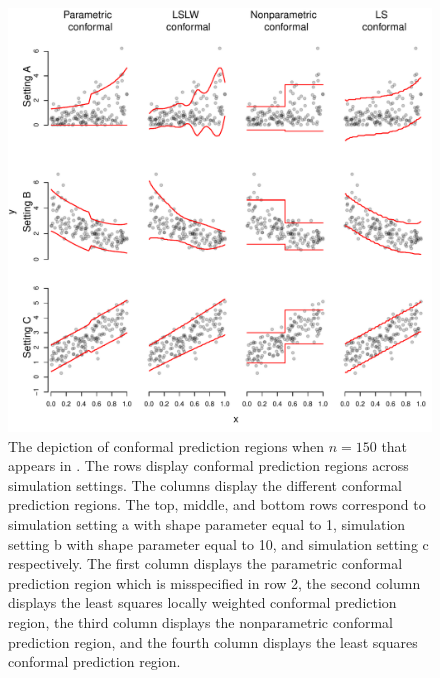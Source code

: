 \documentclass[11pt]{article}\usepackage[]{graphicx}\usepackage[]{color}
\makeatletter
\def\maxwidth{ %
  \ifdim\Gin@nat@width>\linewidth
    \linewidth
  \else
    \Gin@nat@width
  \fi
}
\newenvironment{knitrout}{}{} %
\makeatother
\begin{document}
\newpage
\begin{figure}[h!]
\begin{center}
\begin{knitrout}
\color{fgcolor}
\includegraphics[width=\maxwidth]{figure/conformal-plots-1} 

\end{knitrout}
\end{center}
\caption{The depiction of conformal prediction regions when $n = 150$ that 
  appears in \citet{eck2019conformal}.  The rows display conformal prediction 
  regions across simulation settings.  The columns display the different 
  conformal prediction regions.  The top, middle, and bottom rows correspond 
  to simulation setting a with shape parameter equal to 1, simulation setting 
  b with shape parameter equal to 10, and simulation setting c respectively.  
  The first column displays the parametric conformal prediction region which 
  is misspecified in row 2, the second column displays the least squares 
  locally weighted conformal prediction region, the third column displays the 
  nonparametric conformal prediction region, and the fourth column displays 
  the least squares conformal prediction region.}
\label{conformal-plots}
\end{figure}
\end{document}
